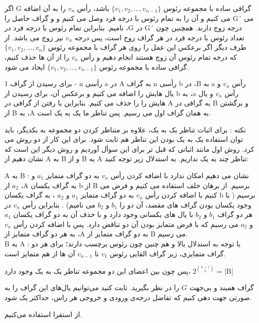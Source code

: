 \documentclass[11pt,largemargins]{h2wp}
\begin{document}
    اگر G گرافی ساده با مجموعه رئوس $\{v_{1}, v_{2}, \dots, v_{n-1}\}$ باشد، رأس $v_n$ را به آن اضافه می کنیم و آن را به تمام رئوس با درجه فرد وصل می کنیم و و گراف حاصل را G´ می نامیم. 
    بنابراین تمام رئوس با درجه فرد در ،G در G´ درجه زوج دارند. همچنین چون تعداد رئوس با درجه فرد در هر گراف زوج است، پس درجه $v_n$ نیز زوج می باشد. از طرف دیگر اگر برعکس این عمل را روی هر گراف با مجموعه رئوس $\{v_{1}, v_{2}, \dots, v_{n}\}$ که درجه تمام رئوس آن زوج هستند انجام دهیم و رأس $v_n$ را از آن ها حذف کنیم، گرافی ساده با مجموعه رئوس $\{v_{1}, v_{2}, \dots, v_{n-1}\}$ ایجاد می شود. 
    
    برای رسیدن از گراف 1 - n رأسی a در A به گراف n رأسی b در ،B به a رأس $v_n$ و یال هایش را اضافه می کنیم و برعکس آن، برای رسیدن از b به ،a رأس $v_n$ و یال هایش را را حذف می کنیم. بنابراین با رفتن از گرافی در A به گرافی در B و برگشتن از B به ،A به همان گراف اول می رسیم. پس تناظر ما یک به یک است.
    
    نکته : برای اثبات تناظر یک به یک، علاوه بر متناظر کردن دو مجموعه به بکدیگر، باید یک به یک بودن این تناظر هم ثابت شود. برای این کار از دو روش می ‎توان استفاده کرد. روش اول مانند اثباتی که قبل تر برای این سوأل آوردیم و روش دیگر این است که نشان دهیم از A به B و از B به A تناظر چند به یک نداریم. به استدلال زیر توجه کنید:
    
    A به B : نشان می دهیم امکان ندارد با اضافه کردن رأس $v_n$ به دو گراف متمایز $a_1$ و $a_2$ از ،A به گراف یکسان b از B برسیم. از برهان خلف  استفاده می کنیم و فرض می کنیم با اضافه کردن رأس $v_n$ به دو گراف متمایز $a_1$ و $a_2$ ، به گراف یکسان b برسیم ( با وجود یکسان بودن گراف های مقصد، آن دو را $b_1$ و $b_2$ می نامیم) . بنابراین رأس $v_n$ در هر دو گراف $b_1$ و $b_2$ با یال های یکسانی وجود دارد و با حذف آن به دو گراف یکسان $a_1$ و $a_2$ می رسیم که با فرض متمایز بودن آن دو تناقض دارد. پس با اضافه کردن رأس $v_n$ به هر دو گراف متمایز از ،A به دو گراف متمایز از B می رسیم.\\
    B به A : با توجه به استدلال بالا و هم چنین چون رئوس برچسب دارند؛ برای هر دو گراف متمایزی، زیر گراف القایی رئوس $v_1$ تا $v_{n-1}$ آن ها از هم متمایز است.
    
    پس چون بین اعضای این دو مجموعه تناظر یک به یک وجود دارد، 
    $2^{{n-1} \choose{2}}$ = |B|
 
 \question

    گراف همبند و بی‌جهت $G$ را در نظر بگیرید. ثابت کنید می‌توانیم یال‌های این گراف را به صورتی جهت ‌دهی کنیم که تفاضل درجه‌ی ورودی و خروجی هر راس، حداکثر یک شود.
 
 \solution
از استقرا استفاده می‌کنیم.
\end{document}
